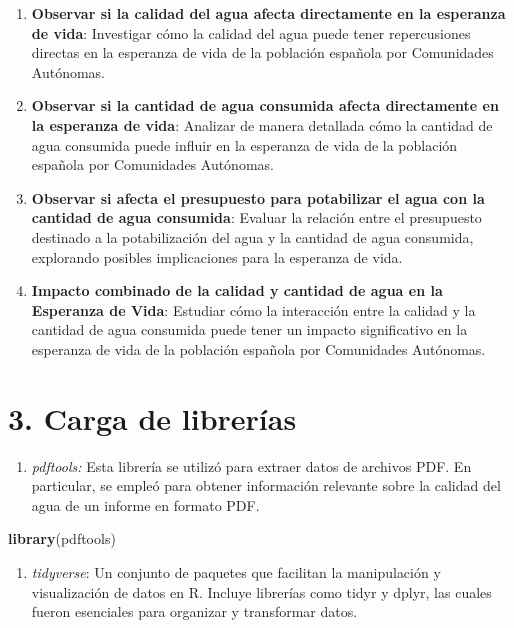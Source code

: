 \documentclass[
]{article}
\newenvironment{Shaded}{\begin{snugshade}}{\end{snugshade}}
\newcommand{\FunctionTok}[1]{\textcolor[rgb]{0.13,0.29,0.53}{\textbf{#1}}}
\newcommand{\NormalTok}[1]{#1}
\providecommand{\tightlist}{%
  \setlength{\itemsep}{0pt}\setlength{\parskip}{0pt}}
\begin{document}
\begin{enumerate}
\def\labelenumi{\arabic{enumi}.}
\item
  \textbf{Observar si la calidad del agua afecta directamente en la
  esperanza de vida}: Investigar cómo la calidad del agua puede tener
  repercusiones directas en la esperanza de vida de la población
  española por Comunidades Autónomas.
\item
  \textbf{Observar si la cantidad de agua consumida afecta directamente
  en la esperanza de vida}: Analizar de manera detallada cómo la
  cantidad de agua consumida puede influir en la esperanza de vida de la
  población española por Comunidades Autónomas.
\item
  \textbf{Observar si afecta el presupuesto para potabilizar el agua con
  la cantidad de agua consumida}: Evaluar la relación entre el
  presupuesto destinado a la potabilización del agua y la cantidad de
  agua consumida, explorando posibles implicaciones para la esperanza de
  vida.
\item
  \textbf{Impacto combinado de la calidad y cantidad de agua en la
  Esperanza de Vida}: Estudiar cómo la interacción entre la calidad y la
  cantidad de agua consumida puede tener un impacto significativo en la
  esperanza de vida de la población española por Comunidades Autónomas.
\end{enumerate}

\hypertarget{carga-de-libreruxedas}{%
\section{3. Carga de librerías}\label{carga-de-libreruxedas}}

\begin{enumerate}
\def\labelenumi{\arabic{enumi}.}
\tightlist
\item
  \emph{pdftools:} Esta librería se utilizó para extraer datos de
  archivos PDF. En particular, se empleó para obtener información
  relevante sobre la calidad del agua de un informe en formato PDF.
\end{enumerate}

\begin{Shaded}
\begin{Highlighting}[]
\FunctionTok{library}\NormalTok{(pdftools)}
\end{Highlighting}
\end{Shaded}

\begin{enumerate}
\def\labelenumi{\arabic{enumi}.}
\setcounter{enumi}{1}
\tightlist
\item
  \emph{tidyverse}: Un conjunto de paquetes que facilitan la
  manipulación y visualización de datos en R. Incluye librerías como
  tidyr y dplyr, las cuales fueron esenciales para organizar y
  transformar datos.
\end{enumerate}
\end{document}
